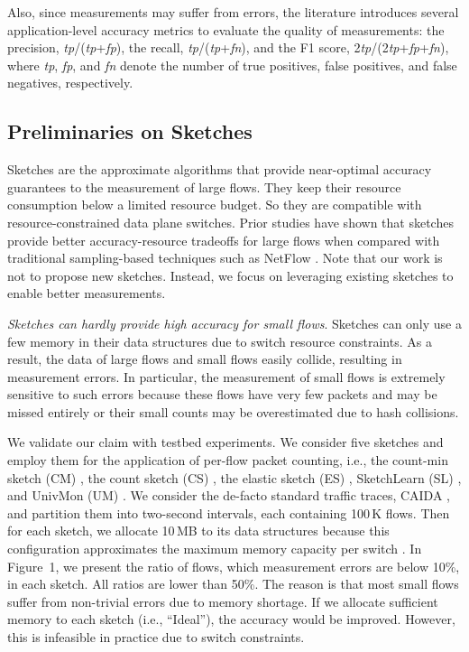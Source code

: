 \noindent Also, since measurements may suffer from errors, the literature introduces several application-level accuracy metrics to evaluate the quality of measurements: the precision, \emph{tp}/(\emph{tp}+\emph{fp}), the recall, \emph{tp}/(\emph{tp}+\emph{fn}), and the F1 score, 2\emph{tp}/(2\emph{tp}+\emph{fp}+\emph{fn}), where \emph{tp}, \emph{fp}, and \emph{fn} denote the number of true positives, false positives, and false negatives, respectively. 

\subsection{Preliminaries on Sketches}

Sketches are the approximate algorithms that provide near-optimal accuracy guarantees to the measurement of large flows. They keep their resource consumption below a limited resource budget. So they are compatible with resource-constrained data plane switches. Prior studies \cite{li2016flowradar,yang2018elastic,huang2017sketchvisor,huang2018sketchlearn,liu2016one,huang2021toward,liu2019nitrosketch,zhang2021cocosketch,namkung2022sketchlib} have shown that sketches provide better accuracy-resource tradeoffs for large flows when compared with traditional sampling-based techniques such as NetFlow \cite{netflow}. Note that our work is not to propose new sketches. Instead, we focus on leveraging existing sketches to enable better measurements. 

 \emph{Sketches can hardly provide high accuracy for small flows}. Sketches can only use a few memory in their data structures due to switch resource constraints. As a result, the data of large flows and small flows easily collide, resulting in measurement errors. In particular, the measurement of small flows is extremely sensitive to such errors because these flows have very few packets and may be missed entirely or their small counts may be overestimated due to hash collisions. 

We validate our claim with testbed experiments. We consider five sketches and employ them for the application of per-flow packet counting, i.e., the count-min sketch (CM) \cite{cormode2005s}, the count sketch (CS) \cite{charikar2004finding}, the elastic sketch (ES) \cite{yang2018elastic}, SketchLearn (SL) \cite{huang2018sketchlearn}, and UnivMon (UM) \cite{liu2016one}. We consider the de-facto standard traffic traces, CAIDA \cite{caida}, and partition them into two-second intervals, each containing 100\,K flows. Then for each sketch, we allocate 10\,MB to its data structures because this configuration approximates the maximum memory capacity per switch \cite{gupta2018sonata}. In Figure~1, we present the ratio of flows, which measurement errors are below 10\%, in each sketch. All ratios are lower than 50\%. The reason is that most small flows suffer from non-trivial errors due to memory shortage. If we allocate sufficient memory to each sketch (i.e., ``Ideal''), the accuracy would be improved. However, this is infeasible in practice due to switch constraints. 

